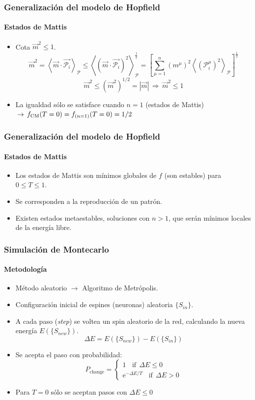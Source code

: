 \documentclass[11pt]{beamer}
\begin{document}
\begin{frame}
\frametitle{Generalización del modelo de Hopfield}
\framesubtitle{Estados de Mattis}
\begin{itemize}
	\item Cota $\vec{m}^2\leq1$.
	\begin{displaymath}
	\vec{m}^2=\left<\vec{m}\cdot\vec{\mathcal{P}_i}\right>_{\mathcal{P}}\leq\left<\left(\vec{m}\cdot\vec{\mathcal{P}_i}\right)^{2}\right>^{\frac{1}{2}}_{\mathcal{P}}=\left[\sum^n_{\mu=1} (m^\mu)^2 \left<\left(\mathcal{P}_i^\mu\right)^2\right>_{\mathcal{P}}\right]^{\frac{1}{2}}
	\end{displaymath}
	\begin{displaymath}
	\vec{m}^2\leq(\vec{m}^2)^{1/2}=|\vec{m}|\,\Rightarrow\,\vec{m}^2\leq1
	\end{displaymath}
	\item La igualdad sólo se satisface cuando $n=1$ (estados de Mattis)$\,\rightarrow\,f_{\textnormal{CM}}(T=0)=f_{(n=1)}(T=0)=1/2$
\end{itemize}
\end{frame}

\begin{frame}
\frametitle{Generalización del modelo de Hopfield}
\framesubtitle{Estados de Mattis}
\begin{itemize}
	\item Los estados de Mattis son mínimos globales de $f$ (son estables) para $0\leq T\leq1$.
	\item Se corresponden a la reproducción de un patrón. 
	\item Existen estados metaestables, soluciones con $n>1$, que serán mínimos locales de la energía libre.
\end{itemize}
\end{frame}

\begin{frame}
\frametitle{Simulación de Montecarlo}
\framesubtitle{Metodología}

\begin{itemize}
    \item Método aleatorio $\longrightarrow$ Algoritmo de Metrópolis.
    \item Configuración inicial de espines (neuronas) aleatoria $\{ S_{in} \}$.
    \item A cada paso (\textit{step}) se voltea un spin aleatorio de la red, calculando la nueva energía $E(\{S_{new}\})$.
    $$
    \Delta E = E(\{S_{new}\}) - E(\{S_{in}\})
    $$
    \item Se acepta el paso con probabilidad:
    $$
    P_{\text{change}} = \left\{
\begin{aligned}
    1 \ \ \ \ \text{if} \ \ \Delta E \leq 0 \\
    \text{e}^{-\Delta E/T} \ \ \ \ \text{if} \ \ \Delta E > 0
\end{aligned}
\right.
    $$
    \item Para $T = 0$ sólo se aceptan pasos con $\Delta E \leq 0$
\end{itemize}
    
\end{frame}
\end{document}
